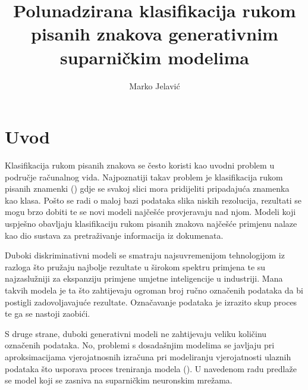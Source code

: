 \documentclass[times, utf8, diplomski]{fer}
\begin{document}

\title{Polunadzirana klasifikacija rukom pisanih znakova generativnim suparničkim modelima}

\author{Marko Jelavić}

\maketitle

\izvornik


\tableofcontents

\chapter{Uvod}
Klasifikacija rukom pisanih znakova se često koristi kao uvodni problem u područje računalnog vida. Najpoznatiji takav problem je klasifikacija rukom pisanih znamenki (\cite{mnist}) gdje se svakoj slici mora pridijeliti pripadajuća znamenka kao klasa. Pošto se radi o maloj bazi podataka slika niskih rezolucija, rezultati se mogu brzo dobiti te se novi modeli najčešće provjeravaju nad njom. Modeli koji uspješno obavljaju klasifikaciju rukom pisanih znakova najčešće primjenu nalaze kao dio sustava za pretraživanje informacija iz dokumenata. \par

Duboki diskriminativni modeli se smatraju najsuvremenijom tehnologijom iz razloga što pružaju najbolje rezultate u širokom spektru primjena te su najzaslužniji za ekspanziju primjene umjetne inteligencije u industriji. Mana takvih modela je ta što zahtijevaju ogroman broj ručno označenih podataka da bi postigli zadovoljavajuće rezultate. Označavanje podataka je izrazito skup proces te ga se nastoji zaobići. \par

S druge strane, duboki generativni modeli ne zahtijevaju veliku količinu označenih podataka. No, problemi s dosadašnjim modelima se javljaju pri aproksimacijama vjerojatnosnih izračuna pri modeliranju vjerojatnosti ulaznih podataka što usporava proces treniranja modela (\cite{GAN}). U navedenom radu predlaže se model koji se zasniva na suparničkim neuronskim mrežama. 
\end{document}
